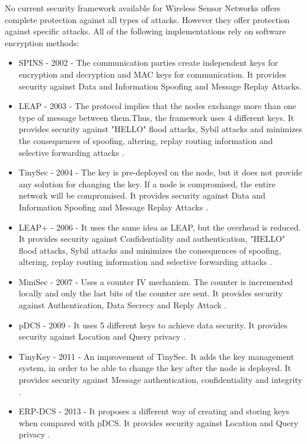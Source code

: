 No current security framework available for Wireless Sensor Networks offers complete protection
against all types of attacks. However they offer protection against specific attacks. All of the following implementations rely on 
software encryption methods:
\begin{itemize}

\item SPINS - 2002 - The communication parties create independent keys for encryption and decryption
and MAC keys for communication. It provides security against Data and Information Spoofing and Message Replay Attacks\cite{perrig2002spins}.

\item LEAP - 2003 - The protocol implies that the nodes exchange more than one type of message between them.Thus, the framework uses 4 different keys. It provides security against "HELLO" flood attacks, Sybil attacks and minimizes the consequences of spoofing, altering, replay routing information and selective forwarding attacks \cite{zhu2006leap+}.

\item TinySec - 2004 - The key is pre-deployed on the node, but it does not provide any solution for changing the key. If a node is compromised, the entire network will be compromised. It provides security against Data and Information Spoofing and Message Replay Attacks \cite{karlof2004tinysec}.

\item LEAP+ - 2006 - It uses the same idea as LEAP, but the overhead is reduced. It provides security against Confidentiality and authentication, "HELLO" flood attacks, Sybil attacks and minimizes the consequences of spoofing, altering, replay routing information and selective forwarding attacks \cite{zhu2006leap+}.
 
\item MiniSec - 2007 - Uses a counter IV mechanism. The counter is incremented locally and only the last bits of the counter are sent. It provides security against Authentication, Data Secrecy and Reply Attack \cite{luk2007minisec}.

\item pDCS - 2009 - It uses 5 different keys to achieve data security. It provides security against Location and Query privacy \cite{shao2009pdcs}.

\item TinyKey - 2011 - An improvement of TinySec. It adds the key management system, in order to be able to change the key after the node is deployed. It provides security against Message authentication, confidentiality and integrity \cite{doriguzzi2011tinykey}.

\item ERP-DCS - 2013 - It proposes a different way of creating and storing keys when compared with pDCS. It provides security against Location and Query privacy \cite{huang2013efficient}.

\end{itemize}
